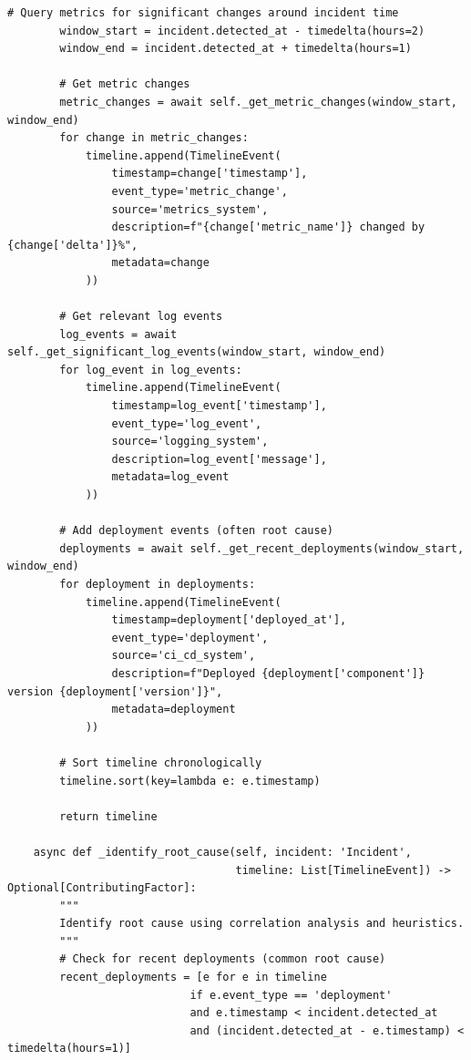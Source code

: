 \begin{lstlisting}[style=python, caption={Post-incident analysis with root cause identification}]
        # Query metrics for significant changes around incident time
        window_start = incident.detected_at - timedelta(hours=2)
        window_end = incident.detected_at + timedelta(hours=1)

        # Get metric changes
        metric_changes = await self._get_metric_changes(window_start, window_end)
        for change in metric_changes:
            timeline.append(TimelineEvent(
                timestamp=change['timestamp'],
                event_type='metric_change',
                source='metrics_system',
                description=f"{change['metric_name']} changed by {change['delta']}%",
                metadata=change
            ))

        # Get relevant log events
        log_events = await self._get_significant_log_events(window_start, window_end)
        for log_event in log_events:
            timeline.append(TimelineEvent(
                timestamp=log_event['timestamp'],
                event_type='log_event',
                source='logging_system',
                description=log_event['message'],
                metadata=log_event
            ))

        # Add deployment events (often root cause)
        deployments = await self._get_recent_deployments(window_start, window_end)
        for deployment in deployments:
            timeline.append(TimelineEvent(
                timestamp=deployment['deployed_at'],
                event_type='deployment',
                source='ci_cd_system',
                description=f"Deployed {deployment['component']} version {deployment['version']}",
                metadata=deployment
            ))

        # Sort timeline chronologically
        timeline.sort(key=lambda e: e.timestamp)

        return timeline

    async def _identify_root_cause(self, incident: 'Incident',
                                   timeline: List[TimelineEvent]) -> Optional[ContributingFactor]:
        """
        Identify root cause using correlation analysis and heuristics.
        """
        # Check for recent deployments (common root cause)
        recent_deployments = [e for e in timeline
                            if e.event_type == 'deployment'
                            and e.timestamp < incident.detected_at
                            and (incident.detected_at - e.timestamp) < timedelta(hours=1)]


\end{lstlisting}
